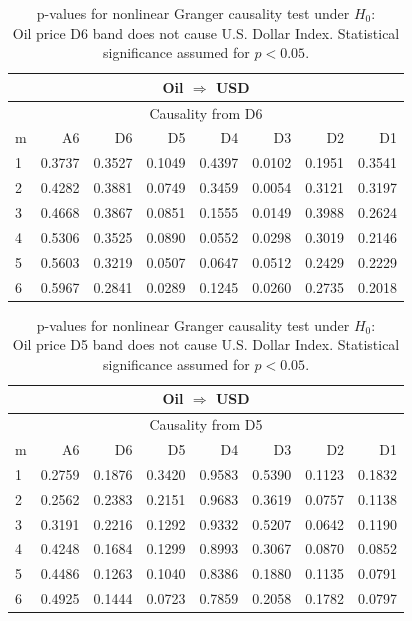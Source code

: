 %
%
\begin{table}[H]
\begin{center}
\begin{tabular}{l|r r r r r r r}
\hline\hline
\multicolumn{8}{c}{Oil $\Rightarrow$ USD}\\
\hline
\multicolumn{8}{c}{Causality from D6}\\
\hline\hline
m & A6 & D6 & D5 & D4 & D3 & D2 & D1 \\
\hline
1 & 0.3737 & 0.3527 & 0.1049 & 0.4397 & \cellcolor{mygreen}0.0102 & 0.1951 & 0.3541 \\
2 & 0.4282 & 0.3881 & 0.0749 & 0.3459 & \cellcolor{mygreen}0.0054 & 0.3121 & 0.3197 \\
3 & 0.4668 & 0.3867 & 0.0851 & 0.1555 & \cellcolor{mygreen}0.0149 & 0.3988 & 0.2624 \\
4 & 0.5306 & 0.3525 & 0.0890 & 0.0552 & \cellcolor{mygreen}0.0298 & 0.3019 & 0.2146 \\
5 & 0.5603 & 0.3219 & 0.0507 & 0.0647 & 0.0512 & 0.2429 & 0.2229 \\
6 & 0.5967 & 0.2841 & \cellcolor{mygreen}0.0289 & 0.1245 & \cellcolor{mygreen}0.0260 & 0.2735 & 0.2018 \\
\hline\hline
\end{tabular}
\caption{p-values for nonlinear Granger causality test under $H_0$:\\
Oil price D6 band does not cause U.S. Dollar Index. Statistical significance assumed for $p<0.05$.}
\end{center}
\end{table}

%
%
\begin{table}[H]
\begin{center}
\begin{tabular}{l|r r r r r r r}
\hline\hline
\multicolumn{8}{c}{Oil $\Rightarrow$ USD}\\
\hline
\multicolumn{8}{c}{Causality from D5}\\
\hline\hline
m & A6 & D6 & D5 & D4 & D3 & D2 & D1 \\
\hline
1 &  0.2759 & 0.1876 & 0.3420 & 0.9583 & 0.5390 & 0.1123 & 0.1832 \\
2 &  0.2562 & 0.2383 & 0.2151 & 0.9683 & 0.3619 & 0.0757 & 0.1138 \\
3 &  0.3191 & 0.2216 & 0.1292 & 0.9332 & 0.5207 & 0.0642 & 0.1190 \\
4 &  0.4248 & 0.1684 & 0.1299 & 0.8993 & 0.3067 & 0.0870 & 0.0852 \\
5 &  0.4486 & 0.1263 & 0.1040 & 0.8386 & 0.1880 & 0.1135 & 0.0791 \\
6 &  0.4925 & 0.1444 & 0.0723 & 0.7859 & 0.2058 & 0.1782 & 0.0797 \\
\hline\hline
\end{tabular}
\caption{p-values for nonlinear Granger causality test under $H_0$:\\
Oil price D5 band does not cause U.S. Dollar Index. Statistical significance assumed for $p<0.05$.}
\end{center}
\end{table}

